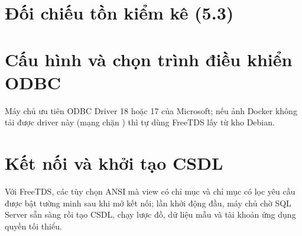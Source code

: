 \section{Đối chiếu tồn kiểm kê (5.3)}

\section{Cấu hình và chọn trình điều khiển ODBC}
\label{sec:pl-ketnoi}
Máy chủ ưu tiên ODBC Driver 18 hoặc 17 của Microsoft; nếu ảnh Docker không tải được driver này (mạng chặn ) thì tự dùng FreeTDS lấy từ kho Debian.

\section{Kết nối và khởi tạo CSDL}
Với FreeTDS, các tùy chọn ANSI mà view có chỉ mục và chỉ mục có lọc yêu cầu được bật tường minh sau khi mở kết nối; lần khởi động đầu, máy chủ chờ SQL Server sẵn sàng rồi tạo CSDL, chạy lược đồ, dữ liệu mẫu và tài khoản ứng dụng quyền tối thiểu.
